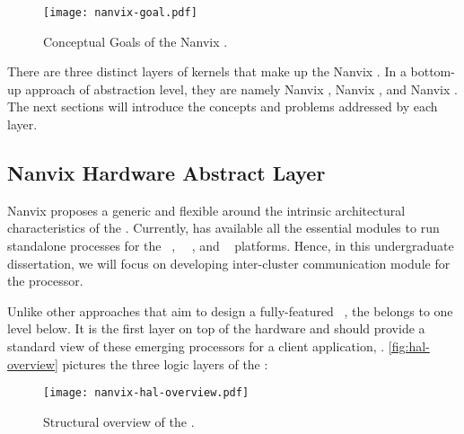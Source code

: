 	\begin{figure}[!tb]
		\centering%
		\caption{Conceptual Goals of the Nanvix \os.}%
		\label{fig:nanvix-goal}%
		\texttt{[image: nanvix-goal.pdf]}%
	\end{figure}

	There are three distinct layers of kernels that make up the Nanvix \os.
	In a bottom-up approach of abstraction level, they are namely Nanvix \hal,
	Nanvix \microkernel, and Nanvix \multikernel.
	The next sections will introduce the concepts and problems addressed by
	each layer.

	\subsection{Nanvix Hardware Abstract Layer}
	\label{sec.hal}

		Nanvix \os proposes a generic and flexible \hal around the
		intrinsic architectural characteristics of the \lightweight \manycores.
		Currently, \hal has available all the essential modules to run standalone
		processes for the \mppa~\cite{DeDinechin2013-1}, \optimsoc~~\cite{Wallentowitz2013},
		and \hero~\cite{Kurth2017} platforms.
		Hence, in this undergraduate dissertation, we will focus on developing
		inter-cluster communication module for the \mppa processor.

		Unlike other approaches that aim to design a fully-featured \os~\cite{Baumann2009,kluge2014,nightingale2009,rhoden2011},
		the \hal belongs to one level below.
		It is the first layer on top of the hardware and should provide a standard
		view of these emerging processors for a client application, \eg \os.
		\autoref{fig:hal-overview} pictures the three logic layers of the \hal:

		\begin{figure}[!tb]
			\centering%
			\caption{Structural overview of the \hal.}%
			\label{fig:hal-overview}%
			\texttt{[image: nanvix-hal-overview.pdf]}%
		\end{figure}

